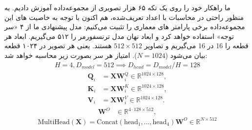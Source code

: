 ما راهکار خود را روی یک تکه ۶۵ هزار تصویری از مجموعه‌داده 
\cite{danbooru2019Portraits}
آموزش دادیم. به منظور راحتی در محاسبات با اعداد تعریف‌شده، هم اکنون با توجه به خاصیت های این مجموعه‌داده برخی پارامتر های معماری را تثبیت می‌کنیم:
مدل پیشنهادی ما از ۴‌ «سر توجه» استفاده خواهد کرد و ابعاد نهان مدل ترنسفورمر را ۵۱۲ می‌گیریم. ابعاد هر قطعه را 16 در 16 می‌گیریم و تصاویر $ 512 \times 512 $ هستند. یعنی هر تصویر در ۱۰۲۴ قطعه بیان می‌شود ($N = 1024 $). 
امتیاز هر سر بصورت زیر محاسبه خواهد شد:
\begin{align*}
	H = 4, D_{model} = 512 \implies
	D_{head} = D_{model} / H = 128
\end{align*}
\begin{align*}
	\mathbf{Q}_i &= \mathbf{X} \mathbf{W}_i^Q \in \mathbb{R}^{1024 \times 128}, \\
	\mathbf{K}_i &= \mathbf{X} \mathbf{W}_i^K \in \mathbb{R}^{1024 \times 128}, \\
	\mathbf{V}_i &= \mathbf{X} \mathbf{W}_i^V \in \mathbb{R}^{1024 \times 128}.
\end{align*}
\begin{align*}
	\mathbf{W}^O & \in  \mathbb{R}^{4 \cdot 128 \times 512},
\end{align*}
$$
\text{MultiHead}(\mathbf{X}) = \text{Concat}(\text{head}_1, \dots, \text{head}_4)\mathbf{W}^O \in \mathbb{R}^{N \times 512}
$$


%
%
%
%
%
%

